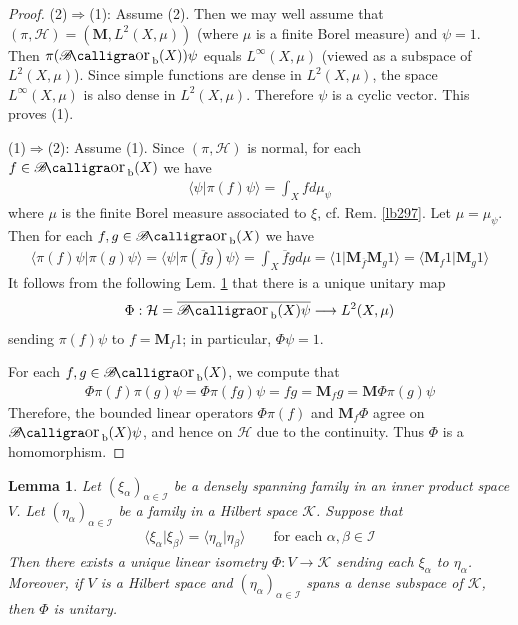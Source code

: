 \documentclass[12pt,b5paper,notitlepage]{article}
\theoremstyle{definition}
\theoremstyle{plain}
\newtheorem{lm}[df]{Lemma}
\DeclareMathOperator{\Borb}{{\mathscr{B}\text{\kern -2pt {\calligra\large or}}\,}_{\mathrm b}}
\newcommand{\ovl}{\overline}
\newcommand{\bk}[1]{\langle {#1}\rangle}
\newcommand{\MH}{\mathcal H}
\newcommand{\MK}{\mathcal K}
\newcommand{\SI}{\mathscr I}
\newcommand{\Mbf}{\mathbf M}
\numberwithin{equation}{section}
\begin{document}
\begin{proof}
(2)$\Rightarrow$(1): Assume (2). Then we may well assume that $(\pi,\MH)=(\Mbf,L^2(X,\mu))$ (where $\mu$ is a finite Borel measure) and $\psi=1$. Then $\pi(\Borb(X))\psi$ equals $L^\infty(X,\mu)$ (viewed as a subspace of $L^2(X,\mu)$). Since simple functions are dense in $L^2(X,\mu)$, the space $L^\infty(X,\mu)$ is also dense in $L^2(X,\mu)$. Therefore $\psi$ is a cyclic vector. This proves (1).

(1)$\Rightarrow$(2): Assume (1). Since $(\pi,\MH)$ is normal, for each $f\in\Borb(X)$ we have
\begin{align*}
\bk{\psi|\pi(f)\psi}=\int_X fd\mu_\psi
\end{align*}
where $\mu$ is the finite Borel measure associated to $\xi$, cf. Rem. \ref{lb297}. Let $\mu=\mu_\psi$. Then for each $f,g\in\Borb(X)$ we have
\begin{align}\label{eq180}
\bk{\pi(f)\psi|\pi(g)\psi}=\bk{\psi|\pi(\ovl fg)\psi}=\int_X\ovl fgd\mu=\bk{1|\Mbf_{\ovl f}\Mbf_g1}=\bk{\Mbf_f1|\Mbf_g1}
\end{align}
It follows from the following Lem. \ref{lb368} that there is a unique unitary map
\begin{align*}
\Phi:\MH=\ovl{\Borb(X)\psi}\longrightarrow L^2(X,\mu)
\end{align*}
sending $\pi(f)\psi$ to $f=\Mbf_f1$; in particular, $\Phi\psi=1$.

For each $f,g\in\Borb(X)$, we compute that
\begin{align*}
\Phi\pi(f)\pi(g)\psi=\Phi\pi(fg)\psi=fg=\Mbf_fg=\Mbf\Phi \pi(g)\psi
\end{align*}
Therefore, the bounded linear operators $\Phi\pi(f)$ and $\Mbf_f\Phi$ agree on $\Borb(X)\psi$, and hence on $\MH$ due to the continuity. Thus $\Phi$ is a homomorphism.
\end{proof}


\begin{lm}\label{lb368}
Let $(\xi_\alpha)_{\alpha\in\SI}$ be a densely spanning family in an inner product space $V$. Let $(\eta_\alpha)_{\alpha\in\SI}$ be a family in a Hilbert space $\MK$. Suppose that
\begin{align}\label{eq189}
\bk{\xi_\alpha|\xi_\beta}=\bk{\eta_\alpha|\eta_\beta}\qquad\text{for each }\alpha,\beta\in\SI
\end{align}
Then there exists a unique linear isometry $\Phi:V\rightarrow \MK$ sending each $\xi_\alpha$ to $\eta_\alpha$. Moreover, if $V$ is a Hilbert space and $(\eta_\alpha)_{\alpha\in\SI}$ spans a dense subspace of $\MK$, then $\Phi$ is unitary.
\end{lm}
\end{document}
